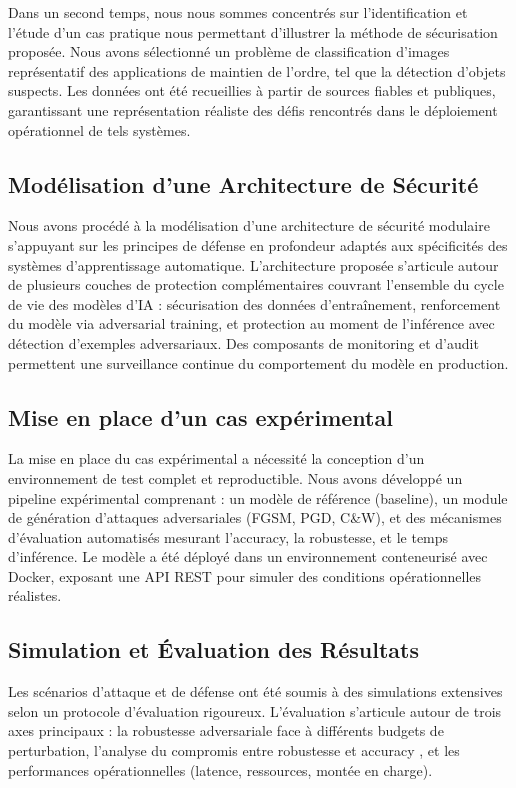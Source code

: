 Dans un second temps, nous nous sommes concentrés sur l'identification et l'étude d'un cas pratique nous permettant d'illustrer la méthode de sécurisation proposée. Nous avons sélectionné un problème de classification d'images représentatif des applications de maintien de l'ordre, tel que la détection d'objets suspects. Les données ont été recueillies à partir de sources fiables et publiques, garantissant une représentation réaliste des défis rencontrés dans le déploiement opérationnel de tels systèmes.

\subsection{Modélisation d'une Architecture de Sécurité}

Nous avons procédé à la modélisation d'une architecture de sécurité modulaire s'appuyant sur les principes de défense en profondeur adaptés aux spécificités des systèmes d'apprentissage automatique. L'architecture proposée s'articule autour de plusieurs couches de protection complémentaires couvrant l'ensemble du cycle de vie des modèles d'IA : sécurisation des données d'entraînement, renforcement du modèle via adversarial training, et protection au moment de l'inférence avec détection d'exemples adversariaux. Des composants de monitoring et d'audit permettent une surveillance continue du comportement du modèle en production.

\subsection{Mise en place d'un cas expérimental}

La mise en place du cas expérimental a nécessité la conception d'un environnement de test complet et reproductible. Nous avons développé un pipeline expérimental comprenant : un modèle de référence (baseline), un module de génération d'attaques adversariales (FGSM, PGD, C\&W), et des mécanismes d'évaluation automatisés mesurant l'accuracy, la robustesse, et le temps d'inférence. Le modèle a été déployé dans un environnement conteneurisé avec Docker, exposant une API REST pour simuler des conditions opérationnelles réalistes.

\subsection{Simulation et Évaluation des Résultats}

Les scénarios d'attaque et de défense ont été soumis à des simulations extensives selon un protocole d'évaluation rigoureux. L'évaluation s'articule autour de trois axes principaux : la robustesse adversariale face à différents budgets de perturbation, l'analyse du compromis entre robustesse et accuracy \cite{tsipras2018robustness}, et les performances opérationnelles (latence, ressources, montée en charge).

